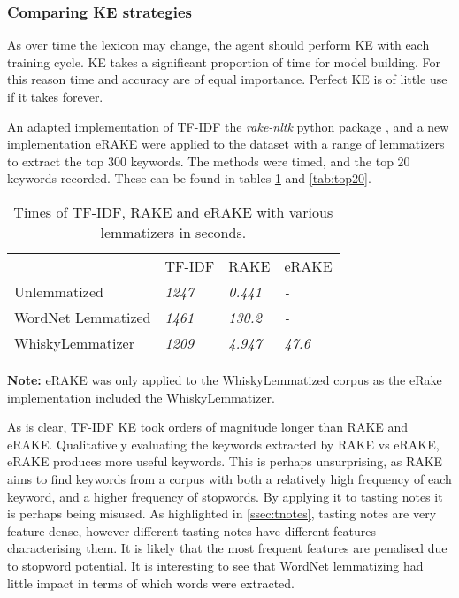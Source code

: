 \subsubsection{Comparing KE strategies}\label{sssec:kwecomp}
As over time the lexicon may change, the agent should perform KE with each training 
cycle. KE takes a significant proportion of time for model building. For this reason time and accuracy are of equal
importance.  Perfect KE is of little use if it takes forever.

An adapted implementation of TF-IDF \cite{tf_idf_imp} the \emph{rake-nltk} python package \cite{sharmer_2018}, and a
new implementation eRAKE were applied to the dataset with a range of lemmatizers to extract the top 300 keywords.
The methods were timed, and the top 20 keywords recorded. 
These can be found in tables \ref{tab:times} and \ref{tab:top20}.

\begin{table}
    \centering
    \begin{threeparttable}

        \caption{Times of TF-IDF, RAKE and eRAKE with various lemmatizers in seconds.}\label{tab:times}
        \begin{tabular}{llll} 
        \toprule
                           & TF-IDF        & RAKE           & eRAKE           \\
        Unlemmatized       & \textit{1247} & \textit{0.441} & \textit{-}      \\
        WordNet Lemmatized & \textit{1461} & \textit{130.2} & \textit{-}      \\
        WhiskyLemmatizer   & \textit{1209} & \textit{4.947} & \textit{47.6}  \\
        \bottomrule
        \end{tabular}
        \begin{tablenotes}
            \small
            \item \textbf{Note:} eRAKE was only applied to the WhiskyLemmatized corpus
            as the eRake implementation included the WhiskyLemmatizer.
        \end{tablenotes}
    \end{threeparttable}
\end{table}

As is clear, TF-IDF KE took orders of magnitude longer than RAKE and eRAKE.  
Qualitatively evaluating the keywords extracted by RAKE vs eRAKE, eRAKE produces more useful keywords.
This is perhaps unsurprising, as RAKE aims to find keywords from a corpus with both a relatively high frequency
of each keyword, and a higher frequency of stopwords.  By applying it to tasting notes it is perhaps 
being misused. As highlighted in \autoref{ssec:tnotes}, tasting notes are very feature dense, however different
tasting notes have different features characterising them.  It is likely that the most frequent features are
penalised due to stopword potential. It is interesting to see that WordNet lemmatizing had little impact 
in terms of which words were extracted.

